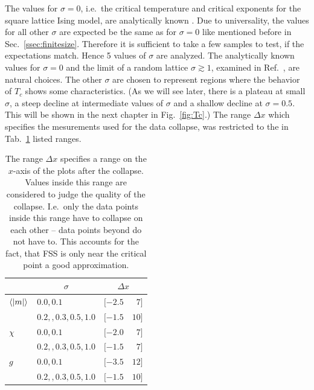     The values for \(\sigma = 0\), i.e.\ the critical temperature and
    critical exponents for the square lattice Ising model,
    are analytically known \cite{Pelissetto2002}. Due to universality, the
    values for all other \(\sigma\) are expected be the same as for
    \(\sigma = 0\) like mentioned before in Sec.\ \ref{ssec:finitesize}.
    Therefore it is sufficient to take a few samples to test, if the
    expectations match. Hence 5 values of \(\sigma\) are analyzed.
    The analytically known values for \(\sigma = 0\) and the
    limit of a random lattice \(\sigma \gtrsim 1\), examined in
    Ref.\ \cite{Janke1994}, are natural choices.
    The other \(\sigma\) are chosen to represent regions where the behavior of
    \(T_c\) shows some characteristics. (As we will see later, there is a plateau at small
    \(\sigma\), a steep decline at intermediate values of \(\sigma\) and a shallow
    decline at \(\sigma = 0.5\). This will be shown in the next
    chapter in Fig.\ \ref{fig:Tc}.)
    The range \(\Delta x\) which specifies the mesurements used for the
    data collapse, was restricted to the in Tab.\ \ref{tab:FSS_range}
    listed ranges.
    \begin{table}[htbp]
        \center
        \begin{tabular}{l l l@{, }r}
            \toprule
                                & \multicolumn{1}{c}{\(\sigma\) }   & \multicolumn{2}{c}{\(\Delta x\)}\\
            \midrule
            \(\left< \left\vert m\right\vert \right>\)   & \(0.0, 0.1\)                      & \([-2.5\) & \( 7]\)\\
                                & \(0.2, ,0.3, 0.5, 1.0\)           & \([-1.5\) & \(10]\)\\
            \(\chi\)            & \(0.0, 0.1\)                      & \([-2.0\) & \( 7]\)\\
                                & \(0.2, ,0.3, 0.5, 1.0\)           & \([-1.5\) & \( 7]\)\\
            \(g\)               & \(0.0, 0.1\)                      & \([-3.5\) & \(12]\)\\
                                & \(0.2, ,0.3, 0.5, 1.0\)           & \([-1.5\) & \(10]\)\\
            \bottomrule
        \end{tabular}
        \caption[Ranges of the Data Collapse]{
            The range \(\Delta x\) specifies a range on the \(x\)-axis of
            the plots after the collapse. Values inside this range are
            considered to judge the quality of the collapse. I.e.\ only
            the data points inside this range have to collapse on each
            other -- data points beyond do not have to. This accounts
            for the fact, that FSS is only near the critical point a good
            approximation.
        }
        \label{tab:FSS_range}
    \end{table}\\
